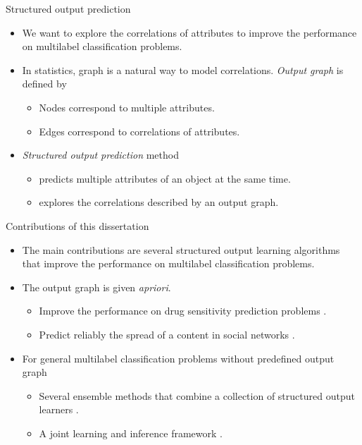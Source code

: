\documentclass[first=dgreen,second=purple,logo=yellowexc]{aaltoslides}
\begin{document}
{\begin{frame}{Structured output prediction}
	\begin{itemize}
		\item We want to explore the correlations of attributes to improve the performance on multilabel classification problems.
		\item In statistics, graph is a natural way to model correlations. \textit{Output graph} is defined by
		\begin{itemize}
			\footnotesize
			\item Nodes correspond to multiple attributes.
			\item Edges correspond to correlations of attributes.
		\end{itemize}
		\item \textit{Structured output prediction} method
		\begin{itemize}
			\footnotesize
			\item predicts multiple attributes of an object at the same time.
			\item explores the correlations described by an output graph.
		\end{itemize}
	\end{itemize}
\end{frame}

\begin{frame}{Contributions of this dissertation}
	\begin{itemize}
		\item The main contributions are several structured output learning algorithms that improve the performance on multilabel classification problems.
		\item The output graph is given \textit{apriori}.
		\begin{itemize}
			\footnotesize
			\item Improve the performance on drug sensitivity prediction problems \citep{su10structured}.
			\item Predict reliably the spread of a content in social networks \citep{su14structured}.
		\end{itemize}
		\item For general multilabel classification problems without predefined output graph
		\begin{itemize}
			\footnotesize
			\item Several ensemble methods that combine a collection of structured output learners \citep{su11mutitask,su2013multilabelacml,su14multilabel}.
			\item A joint learning and inference framework \citep{su14multilabelnips}.
		\end{itemize}
	\end{itemize}
\end{frame}


}
\end{document}
